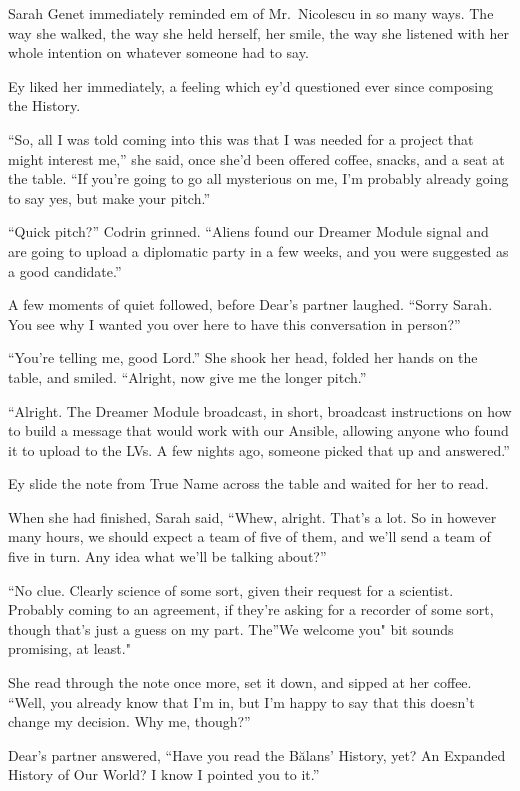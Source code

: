 Sarah Genet immediately reminded em of Mr.~Nicolescu in so many ways. The way she walked, the way she held herself, her smile, the way she listened with her whole intention on whatever someone had to say.

Ey liked her immediately, a feeling which ey'd questioned ever since composing the History.

``So, all I was told coming into this was that I was needed for a project that might interest me,'' she said, once she'd been offered coffee, snacks, and a seat at the table. ``If you're going to go all mysterious on me, I'm probably already going to say yes, but make your pitch.''

``Quick pitch?'' Codrin grinned. ``Aliens found our Dreamer Module signal and are going to upload a diplomatic party in a few weeks, and you were suggested as a good candidate.''

A few moments of quiet followed, before Dear's partner laughed. ``Sorry Sarah. You see why I wanted you over here to have this conversation in person?''

``You're telling me, good Lord.'' She shook her head, folded her hands on the table, and smiled. ``Alright, now give me the longer pitch.''

``Alright. The Dreamer Module broadcast, in short, broadcast instructions on how to build a message that would work with our Ansible, allowing anyone who found it to upload to the LVs. A few nights ago, someone picked that up and answered.''

Ey slide the note from True Name across the table and waited for her to read.

When she had finished, Sarah said, ``Whew, alright. That's a lot. So in however many hours, we should expect a team of five of them, and we'll send a team of five in turn. Any idea what we'll be talking about?''

``No clue. Clearly science of some sort, given their request for a scientist. Probably coming to an agreement, if they're asking for a recorder of some sort, though that's just a guess on my part. The''We welcome you" bit sounds promising, at least."

She read through the note once more, set it down, and sipped at her coffee. ``Well, you already know that I'm in, but I'm happy to say that this doesn't change my decision. Why me, though?''

Dear's partner answered, ``Have you read the Bălans' History, yet? An Expanded History of Our World? I know I pointed you to it.''

